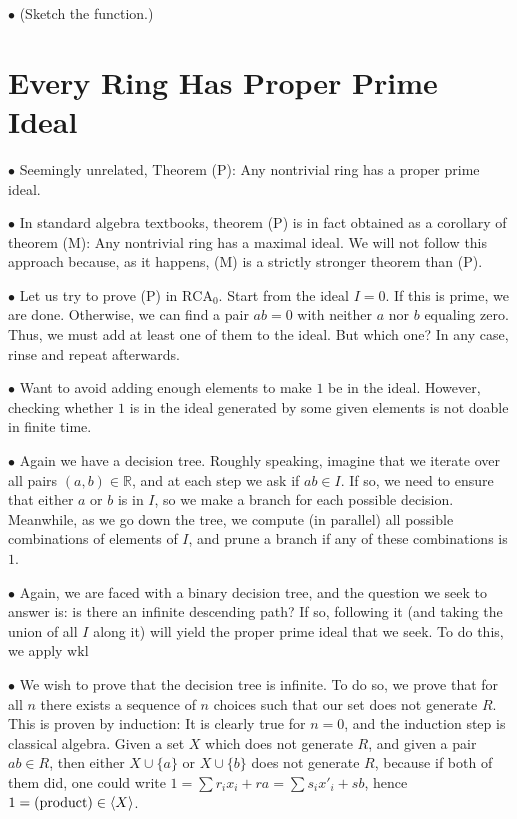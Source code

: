 \documentclass{article}
\theoremstyle{nonumberplain}
\newcommand{\R}{\mathbb{R}}
\newcommand{\RCA}{\mathrm{RCA}}
\newcommand{\wkl}{\mathrm{wkl}}
\DeclarePairedDelimiter{\braket}{\langle}{\rangle}
\newcommand\point[1]{\noindent \hspace{\labelsep} $\bullet$ #1 \smallskip}
\newcommand\timestamp[1]{}
\begin{document}
\point{(Sketch the function.)}

\timestamp{45 minutes}

\section{Every Ring Has Proper Prime Ideal}

\point{Seemingly unrelated, Theorem (P): Any nontrivial ring has a proper prime ideal.}

\point{In standard algebra textbooks, theorem (P) is in fact obtained as a corollary of theorem (M): Any nontrivial ring has a maximal ideal. We will not follow this approach because, as it happens, (M) is a strictly stronger theorem than (P).}

\point{Let us try to prove (P) in $\RCA_0$. Start from the ideal $I = 0$. If this is prime, we are done. Otherwise, we can find a pair $ab = 0$ with neither $a$ nor $b$ equaling zero. Thus, we must add at least one of them to the ideal. But which one? In any case, rinse and repeat afterwards.}

\point{Want to avoid adding enough elements to make $1$ be in the ideal. However, checking whether $1$ is in the ideal generated by some given elements is not doable in finite time.}

\point{Again we have a decision tree. Roughly speaking, imagine that we iterate over all pairs $(a,b) \in \R$, and at each step we ask if $ab \in I$. If so, we need to ensure that either $a$ or $b$ is in $I$, so we make a branch for each possible decision. Meanwhile, as we go down the tree, we compute (in parallel) all possible combinations of elements of $I$, and prune a branch if any of these combinations is $1$.}

\point{Again, we are faced with a binary decision tree, and the question we seek to answer is: is there an infinite descending path? If so, following it (and taking the union of all $I$ along it) will yield the proper prime ideal that we seek. To do this, we apply $\wkl$}

\point{We wish to prove that the decision tree is infinite. To do so, we prove that for all $n$ there exists a sequence of $n$ choices such that our set does not generate $R$. This is proven by induction: It is clearly true for $n = 0$, and the induction step is classical algebra. Given a set $X$ which does not generate $R$, and given a pair $ab \in R$, then either $X \cup \{a\}$ or $X \cup \{b\}$ does not generate $R$, because if both of them did, one could write $1 = \sum r_i x_i  + r a = \sum s_i x'_i + s b$, hence $1 = \text{(product)} \in \braket{X}$.}
\end{document}

